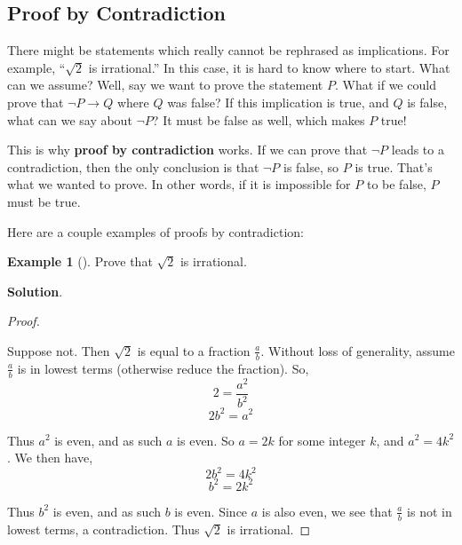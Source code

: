 \documentclass[10pt,]{book}
\newcommand{\terminology}[1]{\textbf{#1}}
\theoremstyle{plain}
\theoremstyle{definition}
\theoremstyle{definition}
\newtheorem{example}[theorem]{Example}
\theoremstyle{definition}
\theoremstyle{definition}
\numberwithin{equation}{chapter}
\def\imp{\rightarrow}
\begin{document}
\subsection[{Proof by Contradiction}]{Proof by Contradiction}\label{subsection-41}
\hypertarget{p-1966}{}%
%
\par
\hypertarget{p-1967}{}%
There might be statements which really cannot be rephrased as implications. For example, ``\(\sqrt 2\) is irrational.'' In this case, it is hard to know where to start. What can we assume? Well, say we want to prove the statement \(P\). What if we could prove that \(\neg P \imp Q\) where \(Q\) was false? If this implication is true, and \(Q\) is false, what can we say about \(\neg P\)? It must be false as well, which makes \(P\) true!%
\par
\hypertarget{p-1968}{}%
This is why \terminology{proof by contradiction} works. If we can prove that \(\neg P\) leads to a contradiction, then the only conclusion is that \(\neg P\) is false, so \(P\) is true. That's what we wanted to prove. In other words, if it is impossible for \(P\) to be false, \(P\) must be true.%
\par
\hypertarget{p-1969}{}%
Here are a couple examples of proofs by contradiction:%
\begin{example}[]\label{example-69}
\hypertarget{p-1970}{}%
Prove that \(\sqrt{2}\) is irrational.%
\par\smallskip%
\noindent\textbf{Solution}.\hypertarget{solution-184}{}\quad%
\begin{proof}\hypertarget{proof-26}{}
\hypertarget{p-1971}{}%
Suppose not. Then \(\sqrt 2\) is equal to a fraction \(\frac{a}{b}\). Without loss of generality, assume \(\frac{a}{b}\) is in lowest terms (otherwise reduce the fraction). So,%
\begin{equation*}
2 = \frac{a^2}{b^2}
\end{equation*}
%
\begin{equation*}
2b^2 = a^2
\end{equation*}
%
\par
\hypertarget{p-1972}{}%
Thus \(a^2\) is even, and as such \(a\) is even. So \(a = 2k\) for some integer \(k\), and \(a^2 = 4k^2\). We then have,%
\begin{equation*}
2b^2 = 4k^2
\end{equation*}
%
\begin{equation*}
b^2 = 2k^2
\end{equation*}
%
\par
\hypertarget{p-1973}{}%
Thus \(b^2\) is even, and as such \(b\) is even. Since \(a\) is also even, we see that \(\frac{a}{b}\) is not in lowest terms, a contradiction. Thus \(\sqrt 2\) is irrational.%
\end{proof}
\end{example}
\end{document}
